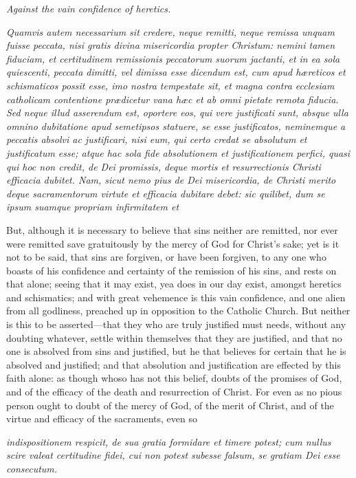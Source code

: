 \emph{Against the vain confidence of heretics.}

\emph{Quamvis autem necessarium sit credere, neque remitti, neque remissa unquam fuisse peccata, nisi gratis divina misericordia propter Christum: nemini tamen fiduciam, et certitudinem remissionis peccatorum suorum jactanti, et in ea sola quiescenti, peccata dimitti, vel dimissa esse dicendum est, cum apud hæreticos et schismaticos possit esse, imo nostra tempestate sit, et magna contra ecclesiam catholicam contentione prædicetur vana hæc et ab omni pietate remota fiducia. Sed neque illud asserendum est, oportere eos, qui vere justificati sunt, absque ulla omnino dubitatione apud semetipsos statuere, se esse justificatos, neminemque a peccatis absolvi ac justificari, nisi eum, qui certo credat se absolutum et justificatum esse; atque hac sola fide absolutionem et justificationem perfici, quasi qui hoc non credit, de Dei promissis, deque mortis et resurrectionis Christi efficacia dubitet. Nam, sicut nemo pius de Dei misericordia, de Christi merito deque sacramentorum virtute et efficacia dubitare debet: sic quilibet, dum se ipsum suamque propriam infirmitatem et }

But, although it is necessary to believe that sins neither are remitted, nor ever were remitted save gratuitously by the mercy of God for Christ's sake; yet is it not to be said, that sins are forgiven, or have been forgiven, to any one who boasts of his confidence and certainty of the remission of his sins, and rests on that alone; seeing that it may exist, yea does in our day exist, amongst heretics and schismatics; and with great vehemence is this vain confidence, and one alien from all godliness, preached up in opposition to the Catholic Church. But neither is this to be asserted—that they who are truly justified must needs, without any doubting whatever, settle within themselves that they are justified, and that no one is absolved from sins and justified, but he that believes for certain that he is absolved and justified; and that absolution and justification are effected by this faith alone: as though whoso has not this belief, doubts of the promises of God, and of the efficacy of the death and resurrection of Christ. For even as no pious person ought to doubt of the mercy of God, of the merit of Christ, and of the virtue and efficacy of the sacraments, even so

\emph{indispositionem respicit, de sua gratia formidare et timere potest; cum nullus scire valeat certitudine fidei, cui non potest subesse falsum, se gratiam Dei esse consecutum.}

